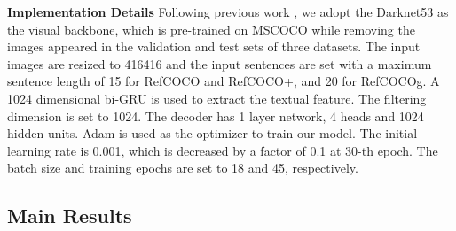 \textbf{Implementation Details}
Following previous work \cite{luo2020multi}, we adopt the Darknet53 \cite{redmon2018yolov3} as the visual backbone, which is pre-trained on MSCOCO while removing the images appeared in the validation and test sets of three datasets. The input images are resized to 416416 and the input sentences are set with a maximum sentence length of 15 for RefCOCO and RefCOCO+, and 20 for RefCOCOg. A 1024 dimensional bi-GRU is used to extract the textual feature. The filtering dimension  is set to 1024. The decoder has 1 layer network, 4 heads and 1024 hidden units. 
Adam \cite{Kingma2014Adam}
is used as the optimizer to train our model. The initial learning rate is 0.001, which is decreased by a factor of 0.1 at 30-th epoch. The batch size and training epochs are set to 18 and 45, respectively.

\subsection{Main Results}

